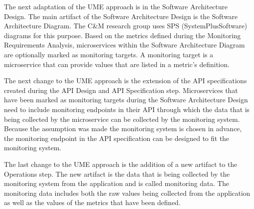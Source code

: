 The next adaptation of the UME approach is in the Software Architecture Design.
The main artifact of the Software Architecture Design is the Software Architecture Diagram.
The C\&M research group uses SPS (SystemPlusSoftware) diagrams for this purpose.
Based on the metrics defined during the Monitoring Requirements Analysis,
microservices within the Software Architecture Diagram are optionally marked as monitoring targets.
A monitoring target is a microservice that can provide values that are listed in a metric's definition.

The next change to the UME approach is the extension of the API specifications created during the
API Design and API Specification step. Microservices that have been marked as monitoring targets
during the Software Architecture Design need to include monitoring endpoints in their API
through which the data that is being collected by the microservice can be collected by the monitoring system.
Because the assumption was made the monitoring system is chosen in advance,
the monitoring endpoint in the API specification can be designed to fit the monitoring system.

The last change to the UME approach is the addition of a new artifact to the Operations step.
The new artifact is the data that is being collected by the monitoring system from the application
and is called monitoring data. The monitoring data includes both the raw values being collected
from the application as well as the values of the metrics that have been defined.

